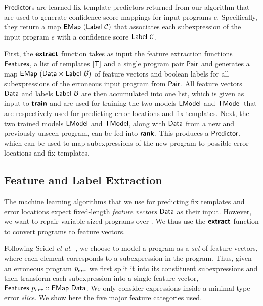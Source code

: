$\mathsf{Predictor}$s are learned fix-template-predictors returned from our algorithm
that are used to generate confidence score mappings for input programs $e$.
Specifically, they return a map $\mathsf{EMap}\ (\mathsf{Label}\ \mathcal{C})$ that associates each
subexpression of the input program $e$ with a confidence score
$\mathsf{Label}\ \mathcal{C}$.

First, the $\bm{\mathsf{extract}}$ function takes as input the feature extraction
functions $\mathsf{Features}$, a list of templates $[\mathsf{T}]$ and a single program
pair $\mathsf{Pair}$ and generates a map $\mathsf{EMap}\ (\mathsf{Data} \times
\mathsf{Label}\ \mathcal{B})$ of feature vectors and boolean labels for all
subexpressions of the erroneous input program from $\mathsf{Pair}$.
%
All feature vectors $\mathsf{Data}$ and labels $\mathsf{Label}\ \mathcal{B}$ are then
accumulated into one list, which is given as input to $\bm{\mathsf{train}}$ and are used
for training the two models $\mathsf{LModel}$ and $\mathsf{TModel}$ that are respectively used
for predicting error locations and fix templates.
%
Next, the two trained models $\mathsf{LModel}$ and $\mathsf{TModel}$, along with $\mathsf{Data}$ from
a new and previously unseen program, can be fed into $\bm{\mathsf{rank}}$. This
produces a $\mathsf{Predictor}$, which can be used to map subexpressions of the new
program to possible error locations and fix templates.




\subsection{Feature and Label Extraction}
\label{sec:templ-pred:extract}
The machine learning algorithms that we use for predicting fix templates and
error locations expect fixed-length \emph{feature vectors} $\mathsf{Data}$ as their
input. However, we want to repair variable-sized programs over \lang. We thus
use the $\bm{\mathsf{extract}}$ function to convert programs to feature vectors.

Following Seidel \emph{et al.}~\citep{Seidel:2017}, we choose to model a program
as a \emph{set} of feature vectors, where each element corresponds to a
subexpression in the program. Thus, given an erroneous program $p_{err}$ we first
split it into its constituent subexpressions and then transform each
subexpression into a single feature vector, \ie $\mathsf{Features}\ p_{err} ::
\mathsf{EMap}\ \mathsf{Data}$. We only consider expressions inside a minimal type-error
\emph{slice}. We show here the five major feature categories used.


